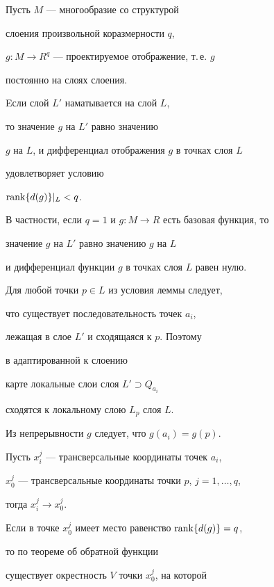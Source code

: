 \begin{lem} \label{qlllll}


Пусть $M$ --- многообразие со структурой


слоения произвольной коразмерности $q$,


$g: M \to R^q$ --- проектируемое отображение, т.\,е. $g$


постоянно на слоях слоения.


Eсли слой $L'$ наматывается на слой $L$,


то значение $g$ на $L'$ равно значению


$g$ на $L$, и дифференциал отображения $g$ в точках слоя $L$


удовлетворяет условию


$\operatorname{rank}\{ d(g)\} |_L < q$.





В частности, если $q=1$ и $g : M \to R$ есть базовая функция, то


значение $g$ на $L'$ равно значению $g$ на $L$


и дифференциал функции $g$ в точках слоя $L$ равен нулю.


\end{lem}





Для любой точки $p\in L$ из условия леммы следует,


что существует последовательность точек $a_i$,


лежащая в слое $L'$ и сходящаяся к $p$. Поэтому


в адаптированной к слоению


карте локальные слои слоя $L' \supset Q_{a_i}$


сходятся к локальному слою $L_p$ слоя $L$.


Из непрерывности $g$ следует, что $g(a_i)=g(p)$.





Пусть $x^j_i$ --- трансверсальные координаты точек $a_i$,


$x^j_0$ --- трансверсальные координаты точки $p$, $j=1,\dotsc,q$,


тогда $x^j_i\to x^j_0$.


Если в точке $x^j_0$ имеет место равенство $\operatorname{rank}\{ d(g)\} =q$,


то по теореме об обратной функции


существует окрестность $V$ точки $x^j_0$, на которой


